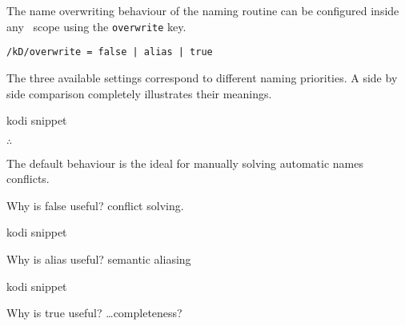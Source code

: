 The name overwriting behaviour of the naming routine can be configured
inside any \koDi\ scope using the \lstinline!overwrite! key.

\begin{lstlisting}
/kD/overwrite = false | alias | true
\end{lstlisting}

The three available settings correspond to different naming priorities.
A side by side comparison completely illustrates their meanings.

\begin{tcblisting}{kodi snippet}
\end{tcblisting}

\hfill$\therefore$\hfill\null

The default behaviour is the ideal for manually solving automatic names
conflicts.

Why is false useful? conflict solving.

\begin{tcblisting}{kodi snippet}
\end{tcblisting}

Why is alias useful? semantic aliasing

\begin{tcblisting}{kodi snippet}
\end{tcblisting}

Why is true useful? \ldots completeness?
